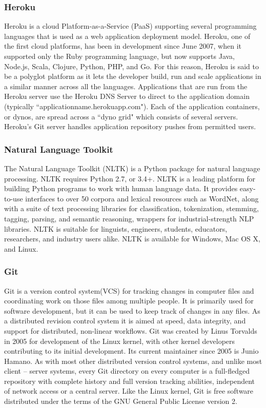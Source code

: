 \subsubsection*{Heroku}
Heroku is a cloud Platform-as-a-Service (PaaS) supporting several programming languages that is used as a web application deployment model.  Heroku, one of the first cloud platforms, has been in development since June 2007, when it supported only the Ruby programming language, but now supports Java, Node.js, Scala, Clojure, Python, PHP, and Go.  For this reason, Heroku is said to be a polyglot platform as it lets the developer build, run and scale applications in a similar manner across all the languages. 
\newline
Applications that are run from the Heroku server use the Heroku DNS Server to direct to the application domain (typically ``applicationname.herokuapp.com").  Each of the application containers, or dynos, are spread across a ``dyno grid" which consists of several servers.  Heroku's Git server handles application repository pushes from permitted users.

\subsubsection*{Natural Language Toolkit}
The Natural Language Toolkit (NLTK) is a Python package for natural language processing. NLTK requires Python 2.7, or 3.4+. NLTK is a leading platform for building Python programs to work with human language data. It provides easy-to-use interfaces to over 50 corpora and lexical resources such as WordNet, along with a suite of text processing libraries for classification, tokenization, stemming, tagging, parsing, and semantic reasoning, wrappers for industrial-strength NLP libraries.
\newline
NLTK is suitable for linguists, engineers, students, educators, researchers, and industry users alike. NLTK is available for Windows, Mac OS X, and Linux.

\subsubsection*{Git}
Git is a version control system(VCS) for tracking changes in computer files and coordinating work on those files among multiple people.  It is primarily used for software development, but it can be used to keep track of changes in any files.  As a distributed revision control system it is aimed at speed, data integrity, and support for distributed, non-linear workflows.
\newline
Git was created by Linus Torvalds in 2005 for development of the Linux kernel, with other kernel developers contributing to its initial development.  Its current maintainer since 2005 is Junio Hamano.
\newline
As with most other distributed version control systems, and unlike most client – server systems, every Git directory on every computer is a full-fledged repository with complete history and full version tracking abilities, independent of network access or a central server.  Like the Linux kernel, Git is free software distributed under the terms of the GNU General Public License version 2.
